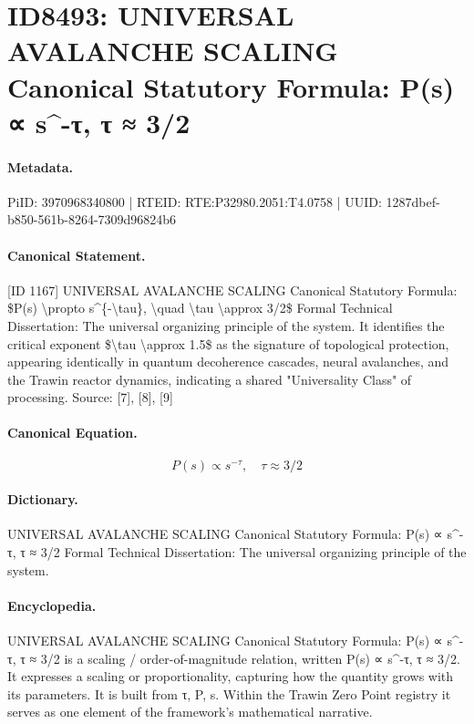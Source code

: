 \section*{ID8493: UNIVERSAL AVALANCHE SCALING Canonical Statutory Formula: P(s) ∝ s\textasciicircum{}-τ, τ ≈ 3/2}
\paragraph{Metadata.}
PiID: 3970968340800 | RTEID: RTE:P32980.2051:T4.0758 | UUID: 1287dbef-b850-561b-8264-7309d96824b6

\paragraph{Canonical Statement.}
[ID 1167] UNIVERSAL AVALANCHE SCALING Canonical Statutory Formula: \$P(s) \textbackslash{}propto s\textasciicircum{}\{-\textbackslash{}tau\}, \textbackslash{}quad \textbackslash{}tau \textbackslash{}approx 3/2\$ Formal Technical Dissertation: The universal organizing principle of the system. It identifies the critical exponent \$\textbackslash{}tau \textbackslash{}approx 1.5\$ as the signature of topological protection, appearing identically in quantum decoherence cascades, neural avalanches, and the Trawin reactor dynamics, indicating a shared "Universality Class" of processing. Source: [7], [8], [9]

\paragraph{Canonical Equation.}
\[
P(s) \propto s^{-\tau}, \quad \tau \approx 3/2
\]

\paragraph{Dictionary.}
UNIVERSAL AVALANCHE SCALING Canonical Statutory Formula: P(s) ∝ s\textasciicircum{}-τ, τ ≈ 3/2 Formal Technical Dissertation: The universal organizing principle of the system.

\paragraph{Encyclopedia.}
UNIVERSAL AVALANCHE SCALING Canonical Statutory Formula: P(s) ∝ s\textasciicircum{}-τ, τ ≈ 3/2 is a scaling / order-of-magnitude relation, written P(s) ∝ s\textasciicircum{}-τ, τ ≈ 3/2. It expresses a scaling or proportionality, capturing how the quantity grows with its parameters. It is built from τ, P, s. Within the Trawin Zero Point registry it serves as one element of the framework's mathematical narrative.
